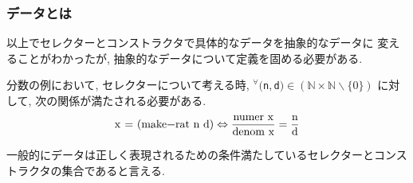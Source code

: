 \subsubsection{データとは}
以上でセレクターとコンストラクタで具体的なデータを抽象的なデータに
変えることがわかったが, 抽象的なデータについて定義を固める必要がある.

\noindent
分数の例において, セレクターについて考える時,
${}^{\forall} ($\lstinline{n}$, $\lstinline{d}$)
\in (\mathbb{N}\times \mathbb{N}\backslash \{0\})$
に対して, 次の関係が満たされる必要がある.
\[
  \text{\lstinline{x = (make-rat n d)}} \Leftrightarrow
  \frac{\text{\lstinline{numer x}}}{\text{\lstinline{denom x}}}
  = \frac{\text{\lstinline{n}}}{\text{\lstinline{d}}}
\]

一般的にデータは正しく表現されるための条件満たしているセレクターとコンストラクタの集合であると言える.
